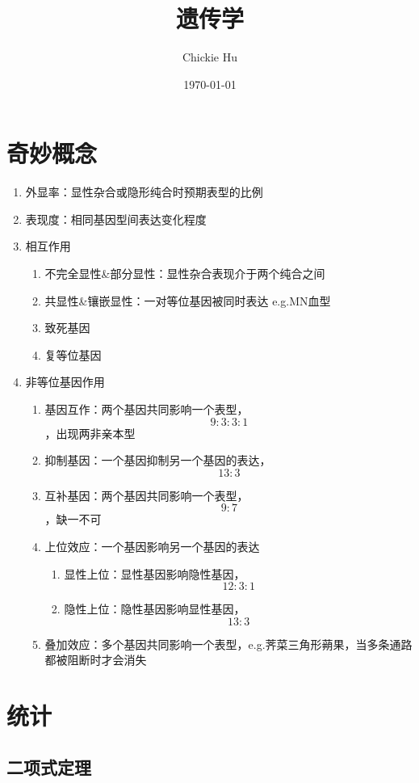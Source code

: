 \documentclass[a4paper, 12pt]{report}
\begin{document}
\title{遗传学}
\author{Chickie Hu}
\date{\today}
\maketitle
\tableofcontents
\chapter{奇妙概念}
\begin{enumerate}
    \item 外显率：显性杂合或隐形纯合时预期表型的比例
    \item 表现度：相同基因型间表达变化程度
    \item 相互作用 \begin{enumerate}
              \item 不完全显性\&部分显性：显性杂合表现介于两个纯合之间
              \item 共显性\&镶嵌显性：一对等位基因被同时表达 e.g.MN血型
              \item 致死基因
              \item 复等位基因
          \end{enumerate}
    \item 非等位基因作用 \begin{enumerate}
              \item 基因互作：两个基因共同影响一个表型，\[9:3:3:1\]，出现两非亲本型
              \item 抑制基因：一个基因抑制另一个基因的表达，\[13:3\]
              \item 互补基因：两个基因共同影响一个表型，\[9:7\]，缺一不可
              \item 上位效应：一个基因影响另一个基因的表达 \begin{enumerate}
                        \item 显性上位：显性基因影响隐性基因，\[12:3:1\]
                        \item 隐性上位：隐性基因影响显性基因，\[13:3\]
                    \end{enumerate}
              \item 叠加效应：多个基因共同影响一个表型，e.g.荠菜三角形蒴果，当多条通路都被阻断时才会消失
          \end{enumerate}
\end{enumerate}
\chapter{统计}
\section{二项式定理}
\end{document}
